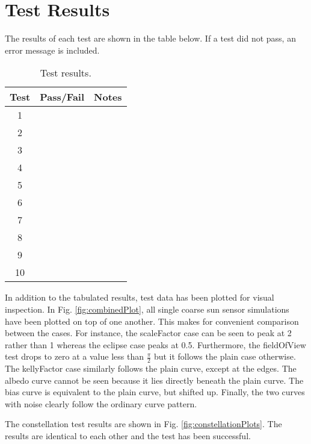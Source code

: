 \section{Test Results}
The results of each test are shown in the table below. If a test did not pass, an error message is included.

\begin{table}[H]
	\caption{Test results.}
	\label{tab:results}
	\centering \fontsize{10}{10}\selectfont
	\begin{tabular}{ c | c | c } %
		\hline
		\textbf{Test} & \textbf{Pass/Fail} 						   		    & \textbf{Notes} 									      \\ \hline
		1	   			  	&      	   & 	         \\ \hline
		2	   			  	&       & 	       \\ \hline
		3	   			  	&& 	 \\ \hline
		4	   			  	& & 	   \\ \hline
		5	   			  	&& 	 \\ \hline
		6	   			  	&      	  & 	              \\ \hline
		7	   			  	&    & 	      \\ \hline
		8	   			  	&      	& 	           \\ \hline
		9	   			  	&  & 	      \\ \hline
		10	   			  	& &\\ \hline
	
	\end{tabular}
\end{table}

In addition to the tabulated results, test data has been plotted for visual inspection. In Fig. \ref{fig:combinedPlot}, all single coarse sun sensor simulations have been plotted on top of one another. This makes for convenient comparison between the cases. For instance, the scaleFactor case can be seen to peak at 2 rather than 1 whereas the eclipse case peaks at 0.5. Furthermore, the fieldOfView test drops to zero at a value less than $\frac{\pi}{2}$ but it follows the plain case otherwise. The kellyFactor case similarly follows the plain curve, except at the edges. The albedo curve cannot be seen because it lies directly beneath the plain curve. The bias curve is equivalent to the plain curve, but shifted up. Finally, the two curves with noise clearly follow the ordinary curve pattern.


\clearpage
The constellation test results are shown in Fig. \ref{fig:constellationPlots}. The results are identical to each other and the test has been successful.


